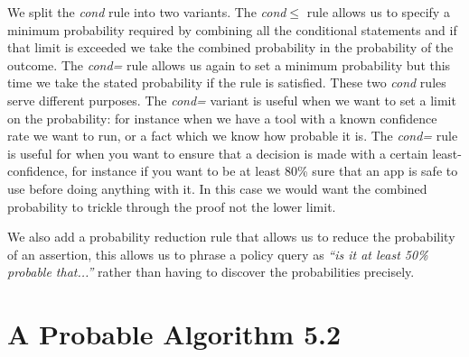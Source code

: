 We split the \emph{cond} rule into two variants. The \emph{cond$\leq$} rule
allows us to specify a minimum probability required by combining all the
conditional statements and if that limit is exceeded we take the combined
probability in the probability of the outcome. The \emph{cond=} rule allows us
again to set a minimum probability but this time we take the stated
probability if the rule is satisfied. These two \emph{cond} rules serve
different purposes. The \emph{cond=} variant is useful when we want to set a
limit on the probability: for instance when we have a tool with a known
confidence rate we want to run, or a fact which we know how probable it is. The
\emph{cond=} rule is useful for when you want to ensure that a decision is made
with a certain least-confidence, for instance if you want to be at least 80\%
sure that an app is safe to use before doing anything with it. In this case we
would want the combined probability to trickle through the proof not the lower
limit.

We also add a probability reduction rule that allows us to reduce the
probability of an assertion, this allows us to phrase a policy query
as \emph{``is it at least 50\% probable that...''} rather than having
to discover the probabilities precisely.

\section{A Probable Algorithm 5.2}


